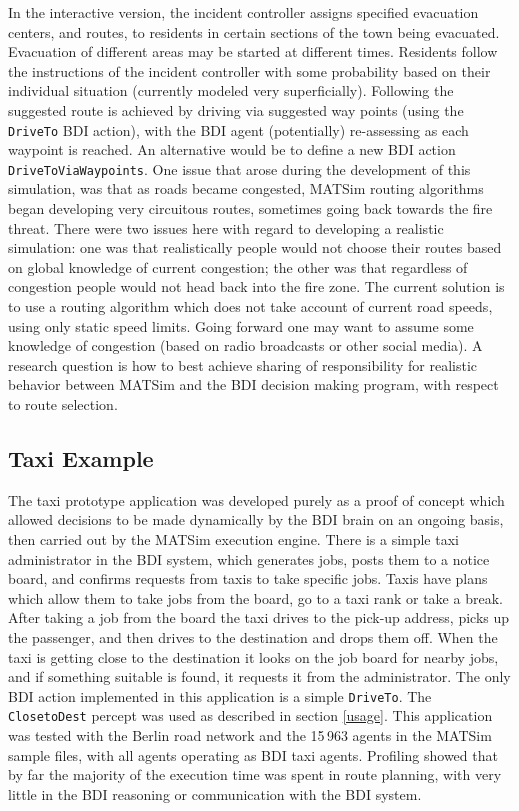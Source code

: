 In the interactive version, the incident controller assigns specified
evacuation centers, and routes, to residents in certain sections of
the town being evacuated. Evacuation of different areas may be started
at different times. Residents follow the instructions of the incident
controller with some probability based on their individual situation
(currently modeled very superficially). Following the suggested route
is achieved by driving via suggested way points  (using the \texttt{DriveTo} BDI
action),  with the BDI agent (potentially) re-assessing as each
waypoint is reached. An alternative would be to define a new BDI
action \texttt{DriveToViaWaypoints}. One issue that arose during the
development of this simulation, was that as roads became congested,
MATSim routing algorithms began developing very circuitous routes,
sometimes going back towards the fire threat. There were two issues
here with regard to developing a realistic simulation: one was that
realistically people would not choose their routes based on global
knowledge of current congestion; the other was that regardless of
congestion people would not head back into the fire zone. The current
solution is to use a routing algorithm which does not take account of
current road speeds, using only static speed limits. Going forward one
may want to assume some knowledge of congestion (based on radio
broadcasts or other social media). A research question is how to best
achieve sharing of responsibility for realistic behavior between
MATSim and the BDI decision making program, with respect to route
selection. 

\subsection{Taxi Example}
The taxi prototype application was developed purely as a proof of
concept which allowed decisions to be made dynamically by the BDI
brain on an ongoing basis, then carried out by the MATSim execution
engine. There is a simple taxi administrator in the BDI system, which
generates jobs, posts them to a notice board, and confirms requests
from taxis to take specific jobs. Taxis have plans which allow them to
take jobs from the board, go to a taxi rank or take a break. After
taking a job from the board the taxi drives to the pick-up address,
picks up the passenger, and then drives to the destination and drops
them off. When the taxi is getting close to the destination it looks
on the job board for nearby jobs, and if something suitable is found,
it requests it from the administrator. The only BDI action implemented
in this application is a simple \texttt{DriveTo}. The
\texttt{ClosetoDest} percept was used as described in section
\ref{usage}. This application was tested with the Berlin road network
and the 15\,963 agents in the MATSim sample files, with all agents
operating as BDI taxi agents. Profiling showed that by far the
majority of the execution time was spent in route planning, with very
little in the BDI reasoning or communication with the BDI system.


